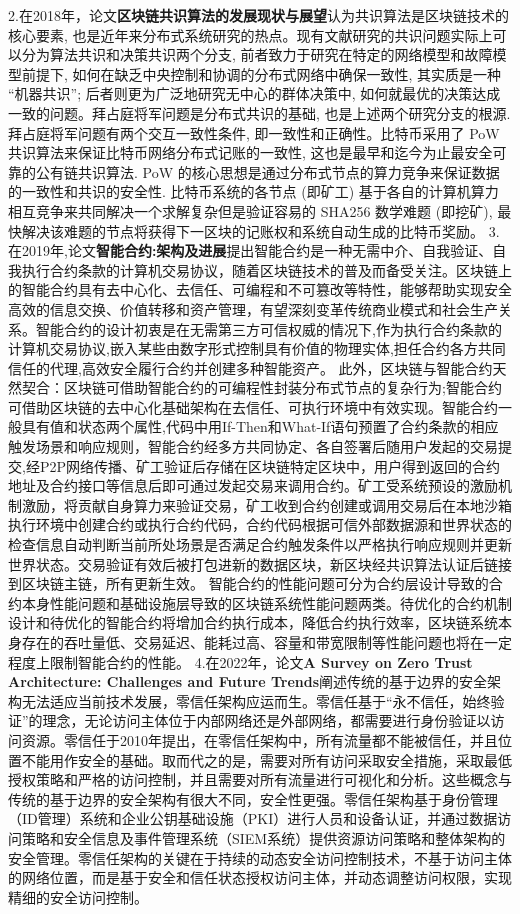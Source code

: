 \documentclass[a4paper,twoside]{scrbook}
\begin{document}
\begin{CJK}{UTF8}{gbsn}
2.在2018年，论文\textbf{区块链共识算法的发展现状与展望}认为共识算法是区块链技术的核心要素, 也是近年来分布式系统研究的热点。现有文献研究的共识问题实际上可以分为算法共识和决策共识两个分支, 前者致力于研究在特定的网络模型和故障模型前提下, 如何在缺乏中央控制和协调的分布式网络中确保一致性, 其实质是一种 “机器共识”; 后者则更为广泛地研究无中心的群体决策中, 如何就最优的决策达成一致的问题。拜占庭将军问题是分布式共识的基础, 也是上述两个研究分支的根源. 拜占庭将军问题有两个交互一致性条件, 即一致性和正确性。比特币采用了 PoW 共识算法来保证比特币网络分布式记账的一致性, 这也是最早和迄今为止最安全可靠的公有链共识算法. PoW 的核心思想是通过分布式节点的算力竞争来保证数据的一致性和共识的安全性. 比特币系统的各节点 (即矿工) 基于各自的计算机算力相互竞争来共同解决一个求解复杂但是验证容易的 SHA256 数学难题 (即挖矿), 最快解决该难题的节点将获得下一区块的记账权和系统自动生成的比特币奖励。
3.在2019年,论文\textbf{智能合约:架构及进展}提出智能合约是一种无需中介、自我验证、自我执行合约条款的计算机交易协议，随着区块链技术的普及而备受关注。区块链上的智能合约具有去中心化、去信任、可编程和不可篡改等特性，能够帮助实现安全高效的信息交换、价值转移和资产管理，有望深刻变革传统商业模式和社会生产关系。智能合约的设计初衷是在无需第三方可信权威的情况下,作为执行合约条款的计算机交易协议,嵌入某些由数字形式控制具有价值的物理实体,担任合约各方共同信任的代理,高效安全履行合约并创建多种智能资产。
此外，区块链与智能合约天然契合：区块链可借助智能合约的可编程性封装分布式节点的复杂行为;智能合约可借助区块链的去中心化基础架构在去信任、可执行环境中有效实现。智能合约一般具有值和状态两个属性,代码中用If-Then和What-If语句预置了合约条款的相应触发场景和响应规则，智能合约经多方共同协定、各自签署后随用户发起的交易提交,经P2P网络传播、矿工验证后存储在区块链特定区块中，用户得到返回的合约地址及合约接口等信息后即可通过发起交易来调用合约。矿工受系统预设的激励机制激励，将贡献自身算力来验证交易，矿工收到合约创建或调用交易后在本地沙箱执行环境中创建合约或执行合约代码，合约代码根据可信外部数据源和世界状态的检查信息自动判断当前所处场景是否满足合约触发条件以严格执行响应规则并更新世界状态。交易验证有效后被打包进新的数据区块，新区块经共识算法认证后链接到区块链主链，所有更新生效。
智能合约的性能问题可分为合约层设计导致的合约本身性能问题和基础设施层导致的区块链系统性能问题两类。待优化的合约机制设计和待优化的智能合约将增加合约执行成本，降低合约执行效率，区块链系统本身存在的吞吐量低、交易延迟、能耗过高、容量和带宽限制等性能问题也将在一定程度上限制智能合约的性能。
4.在2022年，论文\textbf{A Survey on Zero Trust Architecture: Challenges and Future Trends}阐述传统的基于边界的安全架构无法适应当前技术发展，零信任架构应运而生。零信任基于“永不信任，始终验证”的理念，无论访问主体位于内部网络还是外部网络，都需要进行身份验证以访问资源。零信任于2010年提出，在零信任架构中，所有流量都不能被信任，并且位置不能用作安全的基础。取而代之的是，需要对所有访问采取安全措施，采取最低授权策略和严格的访问控制，并且需要对所有流量进行可视化和分析。这些概念与传统的基于边界的安全架构有很大不同，安全性更强。零信任架构基于身份管理（ID管理）系统和企业公钥基础设施（PKI）进行人员和设备认证，并通过数据访问策略和安全信息及事件管理系统（SIEM系统）提供资源访问策略和整体架构的安全管理。零信任架构的关键在于持续的动态安全访问控制技术，不基于访问主体的网络位置，而是基于安全和信任状态授权访问主体，并动态调整访问权限，实现精细的安全访问控制。

\end{CJK}
\end{document}
